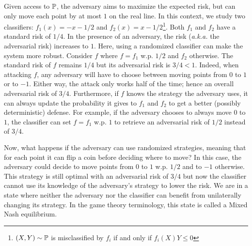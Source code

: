 Given access to $\mathbb{P}$, the adversary aims to maximize the expected risk, but can only move each point by at most $1$ on the real line. In this context, we study two classifiers: $f_1(x) = -x -1/2$ and $f_2(x)=x-1/2$\footnote{$(X,Y) \sim \mathbb{P}$ is misclassified by $f_i$ if and only if $f_i(X)Y \leq 0$}. Both $f_1$ and $f_2$ have a standard risk of $1/4$. In the presence of an adversary, the risk (\emph{a.k.a.} the adversarial risk) increases to $1$. Here, using a randomized classifier can make the system more robust. Consider $f$ where $f=f_1$ w.p. $1/2$ and $f_2$ otherwise. The standard risk of $f$ remains $1/4$ but its adversarial risk is $3/4<1$. Indeed, when attacking $f$, any adversary will have to choose between moving points from $0$ to $1$ or to $-1$. Either way, the attack only works half of the time; hence an overall adversarial risk of $3/4$. Furthermore, if $f$ knows the strategy the adversary uses, it can always update the probability it gives to $f_1$ and $f_2$ to get a better (possibly deterministic) defense. For example, if the adversary chooses to always move $0$ to $1$, the classifier can set $f=f_1$ w.p. $1$ to retrieve an adversarial risk of $1/2$ instead of $3/4$. %

Now, what happens if the adversary can use randomized strategies, meaning that for each point it can flip a coin before deciding where to move? In this case, the adversary could decide to move points from $0$ to $1$ w.p. $1/2$ and to $-1$ otherwise. This strategy is still optimal with an adversarial risk of $3/4$ but now the classifier cannot use its knowledge of the adversary's strategy to lower the risk. We are in a state where neither the adversary nor the classifier can benefit from unilaterally changing its strategy. In the game theory terminology, this state is called a Mixed Nash equilibrium. %

